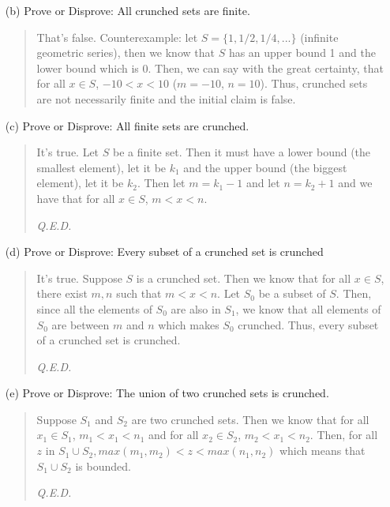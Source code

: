 \documentclass[12pt, a4paper]{article}                      %
\begin{document}
\begin{itemize}
\begin{itemize}
\item[]

\item[(b)]
Prove or Disprove: All crunched sets are finite.
\begin{quote}
That's false. Counterexample: let $S = \{1, 1/2, 1/4, ...\}$ (infinite geometric series), then we know that $S$ has an upper bound 1 and the lower bound which is 0. Then, we can say with the great certainty, that for all $x \in S$, $-10 < x < 10$ ($m = -10$, $n = 10$).
Thus, crunched sets are not necessarily finite and the initial claim is false.
\end{quote} 

\item[]

\item[(c)]
Prove or Disprove: All finite sets are crunched.
\begin{quote}
It's true. Let $S$ be a finite set. Then it must have a lower bound (the smallest element), let it be $k_1$ and the upper bound (the biggest element), let it be $k_2$. Then let $m = k_1 - 1$ and let $n = k_2 + 1$ and we have that for all $x \in S$, $m < x < n$.
\begin{flushright}
\textit{Q.E.D.}
\end{flushright}
\end{quote}

\item[]

\item[(d)]
Prove or Disprove: Every subset of a crunched set is crunched
\begin{quote}
It's true. Suppose $S$ is a crunched set. Then we know that for all $x \in S$, there exist $m, n$ such that $m < x < n$. Let $S_0$ be a subset of $S$. Then, since all the elements of $S_0$ are also in $S_1$, we know that all elements of $S_0$ are between $m$ and $n$ which makes $S_0$ crunched. Thus, every subset of a crunched set is crunched.
\begin{flushright}
\textit{Q.E.D.}
\end{flushright}
\end{quote}

\item[]

\item[(e)]
Prove or Disprove: The union of two crunched sets is crunched.
\begin{quote}
Suppose $S_1$ and $S_2$ are two crunched sets.
Then we know that for all $x_1 \in S_1$, $m_1 < x_1 < n_1$ and for all $x_2 \in S_2$, $m_2 < x_1 < n_2$. Then, for all $z$ in $S_1 \cup S_2, max(m_1, m_2) < z < max(n_1, n_2)$ which means that $S_1 \cup S_2$ is bounded.
\begin{flushright}
\textit{Q.E.D.}
\end{flushright}
\end{quote}

\item[]
\item[]


\end{itemize}

\end{itemize} 
\end{document}
